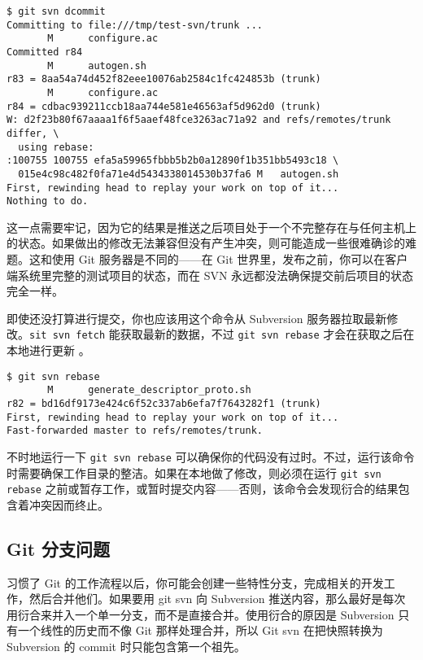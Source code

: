 \documentclass[a4paper]{book}
\begin{document}
\begin{shaded}\begin{verbatim}
$ git svn dcommit
Committing to file:///tmp/test-svn/trunk ...
       M      configure.ac
Committed r84
       M      autogen.sh
r83 = 8aa54a74d452f82eee10076ab2584c1fc424853b (trunk)
       M      configure.ac
r84 = cdbac939211ccb18aa744e581e46563af5d962d0 (trunk)
W: d2f23b80f67aaaa1f6f5aaef48fce3263ac71a92 and refs/remotes/trunk differ, \
  using rebase:
:100755 100755 efa5a59965fbbb5b2b0a12890f1b351bb5493c18 \
  015e4c98c482f0fa71e4d5434338014530b37fa6 M   autogen.sh
First, rewinding head to replay your work on top of it...
Nothing to do.
\end{verbatim}\end{shaded}

这一点需要牢记，因为它的结果是推送之后项目处于一个不完整存在与任何主机上的状态。如果做出的修改无法兼容但没有产生冲突，则可能造成一些很难确诊的难题。这和使用 Git 服务器是不同的------在 Git 世界里，发布之前，你可以在客户端系统里完整的测试项目的状态，而在 SVN 永远都没法确保提交前后项目的状态完全一样。

即使还没打算进行提交，你也应该用这个命令从 Subversion 服务器拉取最新修改。\texttt{sit svn fetch} 能获取最新的数据，不过 \texttt{git svn rebase} 才会在获取之后在本地进行更新 。

\begin{shaded}\begin{verbatim}
$ git svn rebase
       M      generate_descriptor_proto.sh
r82 = bd16df9173e424c6f52c337ab6efa7f7643282f1 (trunk)
First, rewinding head to replay your work on top of it...
Fast-forwarded master to refs/remotes/trunk.
\end{verbatim}\end{shaded}

不时地运行一下 \texttt{git svn rebase} 可以确保你的代码没有过时。不过，运行该命令时需要确保工作目录的整洁。如果在本地做了修改，则必须在运行 \texttt{git svn rebase} 之前或暂存工作，或暂时提交内容------否则，该命令会发现衍合的结果包含着冲突因而终止。

\subsection{Git 分支问题}

习惯了 Git 的工作流程以后，你可能会创建一些特性分支，完成相关的开发工作，然后合并他们。如果要用 git svn 向 Subversion 推送内容，那么最好是每次用衍合来并入一个单一分支，而不是直接合并。使用衍合的原因是 Subversion 只有一个线性的历史而不像 Git 那样处理合并，所以 Git svn 在把快照转换为 Subversion 的 commit 时只能包含第一个祖先。
\end{document}
